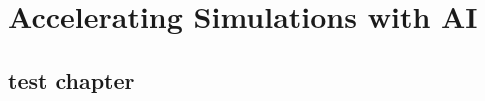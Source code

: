 \documentclass[12pt]{ucsddissertation}
\theoremstyle{definition}
\theoremstyle{definition}
\theoremstyle{definition}
\numberwithin{equation}{section}
\begin{document}

% 
% 


% 
% 

\part{Accelerating Simulations with AI}
\label{part:ml4sim}

\chapter{test chapter}

%  
%  
%  



% 
% 


% 



% 
% 
% 

\backmatter
\nocite{apsrev42Control}

 
\end{document}
